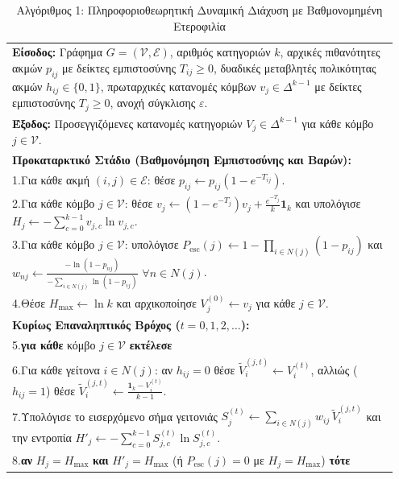 \documentclass[11pt, a4paper]{article}
\theoremstyle{definition}
\theoremstyle{definition}
\begin{document}
\begin{table}[!htbp]
\centering
\caption{Αλγόριθμος 1: Πληροφοριοθεωρητική Δυναμική Διάχυση με Βαθμονομημένη Ετεροφιλία}
\label{tab:algo_gr}
{\small
\begin{tabular}{p{0.95\linewidth}}
\toprule
\textbf{Είσοδος:} Γράφημα $G=(\mathcal{V},\mathcal{E})$, αριθμός κατηγοριών $k$, αρχικές πιθανότητες ακμών $p_{ij}$ με δείκτες εμπιστοσύνης $T_{ij} \ge 0$, δυαδικές μεταβλητές πολικότητας ακμών $h_{ij} \in \{0,1\}$, πρωταρχικές κατανομές κόμβων $v_j \in \Delta^{k-1}$ με δείκτες εμπιστοσύνης $T_j \ge 0$, ανοχή σύγκλισης $\varepsilon$.\\
\textbf{Έξοδος:} Προσεγγιζόμενες κατανομές κατηγοριών $V_j \in \Delta^{k-1}$ για κάθε κόμβο $j \in \mathcal{V}$.\\
\midrule
\textbf{Προκαταρκτικό Στάδιο (Βαθμονόμηση Εμπιστοσύνης και Βαρών):}\\
1.\quad Για κάθε ακμή $(i,j) \in \mathcal{E}$: θέσε $p_{ij} \leftarrow p_{ij}\left(1 - e^{-T_{ij}}\right)$.\\
2.\quad Για κάθε κόμβο $j \in \mathcal{V}$: θέσε $v_j \leftarrow \left(1 - e^{-T_j}\right)v_j + \frac{e^{-T_j}}{k}\mathbf{1}_k$ και υπολόγισε $H_j \leftarrow -\sum_{c=0}^{k-1} v_{j,c}\ln v_{j,c}$.\\
3.\quad Για κάθε κόμβο $j \in \mathcal{V}$: υπολόγισε $P_{\mathrm{esc}}(j) \leftarrow 1 - \prod_{i \in N(j)}(1 - p_{ij})$ και $w_{nj} \leftarrow \frac{-\ln(1-p_{nj})}{-\sum_{i \in N(j)}\ln(1-p_{ij})}$ $\forall n \in N(j)$.\\
4.\quad Θέσε $H_{\max} \leftarrow \ln k$ και αρχικοποίησε $V_j^{(0)} \leftarrow v_j$ για κάθε $j \in \mathcal{V}$.\\[4pt]
\textbf{Κυρίως Επαναληπτικός Βρόχος ($t = 0, 1, 2, \dots$):}\\
5.\quad \textbf{για κάθε} κόμβο $j \in \mathcal{V}$ \textbf{εκτέλεσε}\\
6.\quad\quad Για κάθε γείτονα $i \in N(j)$: αν $h_{ij} = 0$ θέσε $\tilde{V}_i^{(j,t)} \leftarrow V_i^{(t)}$, αλλιώς ($h_{ij}=1$) θέσε $\tilde{V}_i^{(j,t)} \leftarrow \frac{\mathbf{1}_k - V_i^{(t)}}{k - 1}$.\\
7.\quad\quad Υπολόγισε το εισερχόμενο σήμα γειτονιάς $S_j^{(t)} \leftarrow \sum_{i \in N(j)} w_{ij}\,\tilde{V}_i^{(j,t)}$ και την εντροπία $H'_j \leftarrow -\sum_{c=0}^{k-1} S_{j,c}^{(t)}\ln S_{j,c}^{(t)}$.\\
8.\quad\quad \textbf{αν} $H_j = H_{\max}$ \textbf{και} $H'_j = H_{\max}$ (ή $P_{\mathrm{esc}}(j)=0$ με $H_j = H_{\max}$) \textbf{τότε}\\

\end{tabular}}
\end{table}
\end{document}

